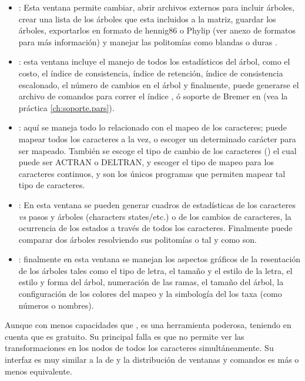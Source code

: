 \begin{itemize}
	\item {}: Esta ventana permite cambiar, abrir archivos externos para incluir \'arboles, crear una lista de los \'arboles que esta incluidos a la matriz, guardar los \'arboles, exportarlos en formato de hennig86 o Phylip (ver anexo de formatos para m\'as informaci\'on) y manejar las politom\'ias como blandas o duras \citep{Coddington1994}.
	\item \Gui{$\Sigma$}: esta ventana incluye el manejo de todos los estad\'isticos  del \'arbol, como el costo, el \'indice de consistencia, \'indice de retenci\'on, \'indice de consistencia escalonado, el n\'umero de cambios en el \'arbol y finalmente, puede generarse el archivo de comandos para correr el \'indice , \'o soporte de Bremer en  (vea la pr\'actica \ref{ch:soporte.pars}).
	\item {}: aqu\'i se maneja todo lo relacionado con el mapeo de los caracteres; puede mapear todos los caracteres a la vez, o escoger un determinado car\'acter para ser mapeado. Tambi\'en se escoge el tipo de cambio de los caracteres () el cual puede ser ACTRAN o DELTRAN, y escoger el tipo de mapeo para los caracteres continuos,  y  son los \'unicos programas que permiten mapear tal tipo de caracteres.
	\item {}: En esta ventana se pueden generar cuadros de estad\'isticas de los caracteres {{\textit{vs}}} pasos y \'arboles (characters states/etc.) o de los cambios de caracteres, la ocurrencia de los estados  a trav\'es de todos los caracteres. Finalmente puede comparar dos \'arboles resolviendo sus politom\'ias o tal y como son.
	\item {}: finalmente en esta ventana se manejan los aspectos gr\'aficos de la resentaci\'on de los \'arboles tales como el tipo de letra, el tama\~no y el estilo de la letra, el estilo y forma del \'arbol, numeraci\'on de las ramas, el tama\~no del \'arbol, la configuraci\'on de los colores  del mapeo y la simbolog\'ia del los taxa (como n\'umeros o nombres).
\end{itemize}

Aunque con menos capacidades que ,  es una herramienta poderosa, teniendo en cuenta que es gratuito. Su principal falla es que no permite ver las transformaciones en los nodos de todos los caracteres simult\'aneamente. Su interfaz es muy similar a la de  y la distribuci\'on de ventanas y comandos es m\'as o menos equivalente.
